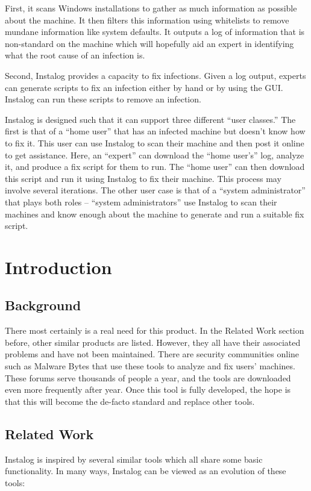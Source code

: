 \documentclass[letterpaper,12pt]{article}
\begin{document}
First, it scans Windows installations to gather as much information as possible
about the machine.  It then filters this information using whitelists to remove
mundane information like system defaults.  It outputs a log of information that
is non-standard on the machine which will hopefully aid an expert in identifying
what the root cause of an infection is.

Second, Instalog provides a capacity to fix infections.  Given a log output,
experts can generate scripts to fix an infection either by hand or by using the
GUI.  Instalog can run these scripts to remove an infection.  

Instalog is designed such that it can support three different ``user classes.'' 
The first is that of a ``home user'' that has an infected machine but doesn't
know how to fix it.  This user can use Instalog to scan their machine and then
post it online to get assistance.  Here, an ``expert'' can download the ``home
user's'' log, analyze it, and produce a fix script for them to run.  The ``home
user'' can then download this script and run it using Instalog to fix their
machine.  This process may involve several iterations.  The other user case is
that of a ``system administrator'' that plays both roles -- ``system
administrators'' use Instalog to scan their machines and know enough about the
machine to generate and run a suitable fix script.  

\newpage



\section{Introduction} \label{introduction}
\subsection{Background}
There most certainly is a real need for this product.  In the Related Work
section before, other similar products are listed.  However, they all have their
associated problems and have not been maintained.  There are security
communities online such as Malware Bytes that use these tools to analyze and fix
users' machines.  These forums serve thousands of people a year, and the tools
are downloaded even more frequently after year.  Once this tool is fully
developed, the hope is that this will become the de-facto standard and replace
other tools.

\subsection{Related Work}
Instalog is inspired by several similar tools which all share some basic
functionality.  In many ways, Instalog can be viewed as an evolution of
these tools:
\end{document}
